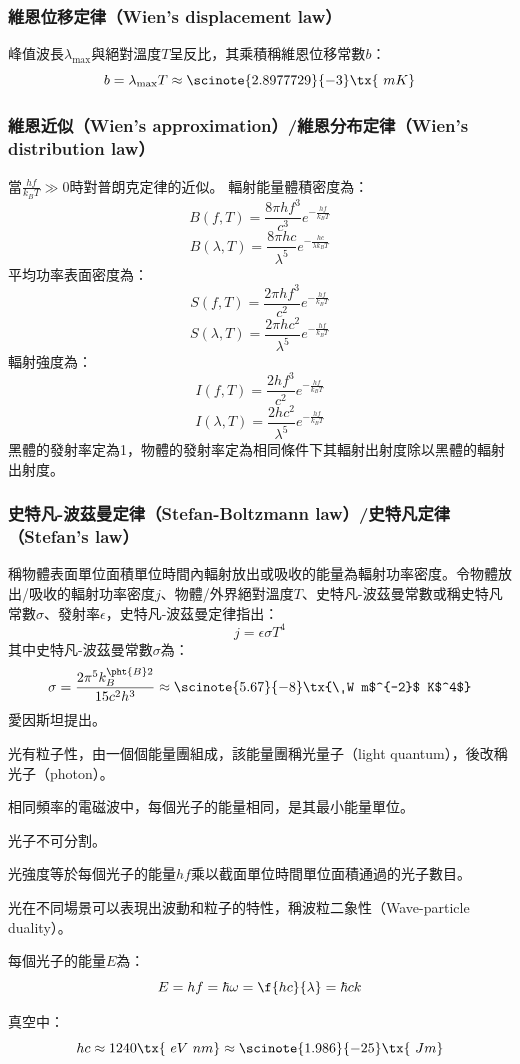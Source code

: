 \documentclass[a4paper,12pt]{article}
\begin{document}
\subsubsection{維恩位移定律（Wien's displacement law）}
峰值波長$\lambda_{\max}$與絕對溫度$T$呈反比，其乘積稱維恩位移常數$b$：
\[b=\lambda_{\max} T \approx \scinote{2.8977729}{-3} \tx{\ m K}\]
\subsubsection{維恩近似（Wien's approximation）/維恩分布定律（Wien's distribution law）}
當$\frac{hf}{k_BT}\gg 0$時對普朗克定律的近似。
輻射能量體積密度為：
\[B(f,T)=\frac{8\pi hf^3}{c^3}e^{-\frac{hf}{k_BT}}\]
\[B(\lambda,T)=\frac{8\pi hc}{\lambda^5}e^{-\frac{hc}{\lambda k_BT}}\]
平均功率表面密度為：
\[S(f,T)=\frac{2\pi hf^3}{c^2}e^{-\frac{hf}{k_BT}}\]
\[S(\lambda,T)=\frac{2\pi hc^2}{\lambda^5}e^{-\frac{hf}{k_BT}}\]
輻射強度為：
\[I(f,T)=\frac{2hf^3}{c^2}e^{-\frac{hf}{k_BT}}\]
\[I(\lambda,T)=\frac{2hc^2}{\lambda^5}e^{-\frac{hf}{k_BT}}\]
黑體的發射率定為1，物體的發射率定為相同條件下其輻射出射度除以黑體的輻射出射度。
\subsubsection{史特凡-波茲曼定律（Stefan-Boltzmann law）/史特凡定律（Stefan's law）}
稱物體表面單位面積單位時間內輻射放出或吸收的能量為輻射功率密度。令物體放出/吸收的輻射功率密度$j$、物體/外界絕對溫度$T$、史特凡-波茲曼常數或稱史特凡常數$\sigma$、發射率$\epsilon$，史特凡-波茲曼定律指出：
\[j=\epsilon\sigma T^4\]
其中史特凡-波茲曼常數$\sigma$為：
\[\sigma=\frac{2\pi^5k_B^{\pht{B}2}}{15c^2h^3}\approx\scinote{5.67}{-8}\tx{\ W m$^{-2}$ K$^4$}\]
愛因斯坦提出。
\bit
\item 光有粒子性，由一個個能量團組成，該能量團稱光量子（light quantum），後改稱光子（photon）。
\item 相同頻率的電磁波中，每個光子的能量相同，是其最小能量單位。
\item 光子不可分割。
\item 光強度等於每個光子的能量$hf$乘以截面單位時間單位面積通過的光子數目。
\item 光在不同場景可以表現出波動和粒子的特性，稱波粒二象性（Wave-particle duality）。
\item 每個光子的能量$E$為：
\[E=hf=\hbar\omega=\f{hc}{\lambda}=\hbar ck\]
\eit

真空中：
\[hc\approx 1240\tx{\ eV\ nm}\approx\scinote{1.986}{-25}\tx{\ J m}\]
\end{document}
